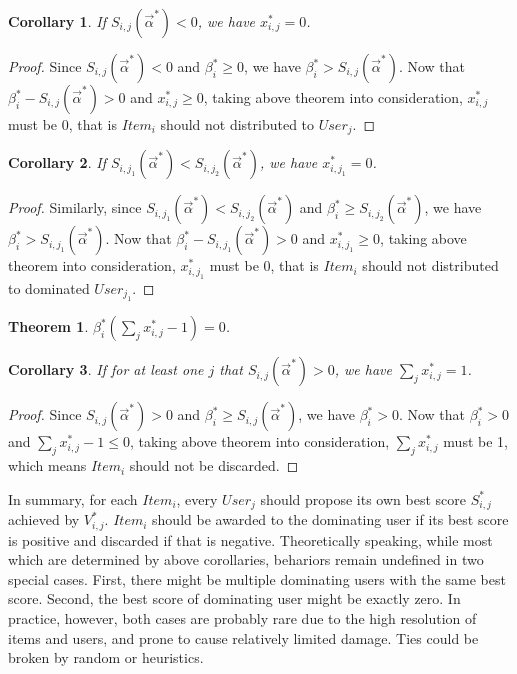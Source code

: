 \documentclass{article}
\newtheorem{theorem}{Theorem}[section]
\newtheorem{corollary}{Corollary}[theorem]
\theoremstyle{definition}
\newcommand{\sx}{x_{i,j}}
\newcommand{\sV}{V_{i,j}}
\newcommand{\sbeta}{\beta_i}
\newcommand{\sS}{S_{i,j}}
\newcommand{\valpha}{\vec{\alpha}}
\begin{document}
\begin{CJK}{UTF8}{gbsn}
\begin{corollary}
If $\sS(\valpha^*) < 0$, we have $\sx^* = 0$.
\end{corollary}

\begin{proof}
Since $\sS(\valpha^*) < 0$ and $\sbeta^* \ge 0$, we have $\sbeta^* > \sS(\valpha^*)$.
Now that $\sbeta^* - \sS(\valpha^*) > 0$ and $\sx^* \ge 0$,
    taking above theorem into consideration, $\sx^*$ must be 0,
    that is $Item_i$ should not distributed to $User_j$.
\end{proof}

\begin{corollary}
If $S_{i,j_1}(\valpha^*) < S_{i,j_2}(\valpha^*)$, we have $x_{i,j_1}^* = 0$.
\end{corollary}

\begin{proof}
Similarly, since $S_{i,j_1}(\valpha^*) < S_{i,j_2}(\valpha^*)$ and $\sbeta^* \ge S_{i,j_2}(\valpha^*)$,
    we have $\sbeta^* > S_{i,j_1}(\valpha^*)$.
Now that $\sbeta^* - S_{i,j_1}(\valpha^*) > 0$ and $x_{i,j_1}^* \ge 0$, 
    taking above theorem into consideration, $x_{i,j_1}^*$ must be 0,
    that is $Item_i$ should not distributed to dominated $User_{j_1}$.
\end{proof}

\begin{theorem}
$\sbeta^*(\sum\limits_j \sx^* - 1) = 0$.
\end{theorem}

\begin{corollary}
If for at least one $j$ that $\sS(\valpha^*) > 0$, we have $\sum\limits_j \sx^* = 1$.
\end{corollary}

\begin{proof}
Since $\sS(\valpha^*) > 0$ and $\sbeta^* \ge \sS(\valpha^*)$, we have $\sbeta^* > 0$.
Now that $\sbeta^* > 0$ and $\sum\limits_j \sx^* - 1 \le 0$,
    taking above theorem into consideration, $\sum\limits_j \sx^*$ must be 1,
    which means $Item_i$ should not be discarded.
\end{proof}

In summary, for each $Item_i$, every $User_j$ should propose its own best score $\sS^*$ achieved by $\sV^*$.
$Item_i$ should be awarded to the dominating user if its best score is positive and discarded if that is negative.
Theoretically speaking, while most which are determined by above corollaries, behariors remain undefined in two special cases.
First, there might be multiple dominating users with the same best score.
Second, the best score of dominating user might be exactly zero.
In practice, however, both cases are probably rare due to the high resolution of items and users, and prone to cause relatively limited damage.
Ties could be broken by random or heuristics.


\end{CJK}
\end{document}

